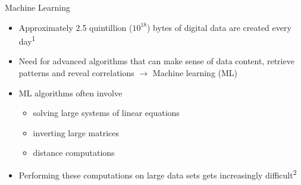 \documentclass[10pt]{beamer}
\begin{document}
{
\begin{frame}[fragile]{Machine Learning}
   
\begin{itemize}
	\item Approximately 2.5 quintillion (${10}^{18}$) bytes of digital data are created every day\textsuperscript{1}
	\item Need for advanced algorithms that can make sense of data content, retrieve patterns and reveal correlations $\rightarrow$ Machine learning (ML) 
	\item ML algorithms often involve
	\begin{itemize}
	\item solving large systems of linear equations
	\item inverting large matrices
	\item distance computations
	\end{itemize}
	\item Performing these computations on large data
sets gets increasingly difficult\textsuperscript{2}


\end{itemize}

\end{frame}
}
\end{document}
